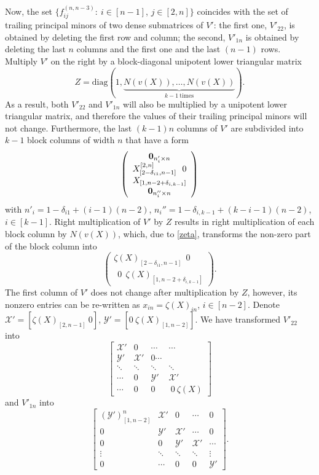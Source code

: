 \documentclass{amsart}
\theoremstyle{definition}
\theoremstyle{remark}
\numberwithin{equation}{section}
\numberwithin{theorem}{section}
\begin{document}
Now, the set $\{ f_{ij}^{(n, n-3)}{{:\ }} i\in [n-1]$, $j\in [2, n]\}$
coincides with the set of trailing principal minors of two dense submatrices of
$V'$: the first one, $V'_{22}$, is obtained by deleting the first row
and column; the second, $V'_{1n}$ is obtained by deleting the last $n$ columns and
the first one and the last $(n-1)$ rows.
Multiply $V'$ on the right by a block-diagonal unipotent lower triangular
matrix 
$$
Z=\mbox{diag}(1,\underbrace{N(v(X)),\ldots, N(v(X))}_{k-1 \ \mbox{times}}).
$$ 
As a result, both $V'_{22}$ and  $V'_{1n}$ will also be multiplied by a
unipotent lower triangular matrix, and therefore the values  of their trailing principal
minors will not change. Furthermore, the last $(k-1)n$ columns of   $V'$ are
subdivided into $k-1$ block columns of width $n$  that have a  form
$$
\left (
\begin{array}{c}
{\bf 0}_{n'_i\times n} \\
X_{[2-\delta_{i1},n-1]}^{[2,n]} \ \ 0\\
 X_{[1,n-2+\delta_{i,k-1}]} \\
{\bf 0}_{n_i''\times n} 
\end{array}
\right ) 
$$
with $n'_i=1-\delta_{i1}+(i-1)(n-2)$, $n_i''=1-\delta_{i,k-1}+(k-i-1)(n-2)$, $i\in [k-1]$.
Right multiplication of $V'$ by $Z$ results in right multiplication of each
block column
by $N(v(X))$, which, due to \eqref{zeta}, transforms the non-zero part of the block
column into
$$
\left (
\begin{array}{c}
\zeta(X)_{[2-\delta_{i1},n-1]} \ \  0\\
\ \ 0\ \ \zeta(X)_{[1,n-2+\delta_{i,k-1}]}
\end{array}
\right ).
$$
The first column of $V'$ does not change after multiplication by $Z$, however,
its nonzero entries can be re-written as $x_{in}=\zeta(X)_{in}$,  $i\in[n-2]$.
Denote  ${{\mathcal X}}'=\left [\zeta(X)_{[2,n-1]}\ 0\right ]$, ${{\mathcal Y}}'=\left [ 0\
\zeta(X)_{[1,n-2]}\right ]$.
We have transformed $V'_{22}$ into
\[
 \left [
\begin{array}{cccc}
 {{\mathcal X}}' & 0 & \cdots & \cdots\\
{{\mathcal Y}}' & {{\mathcal X}}' & 0 \cdots  \\
 \ddots& \ddots &\ddots & \ddots \\
 \cdots & 0 & {{\mathcal Y}}' & {{\mathcal X}}' \\
\cdots & 0 &0 &\  0\  \zeta(X)
\end{array}
\right ]
\]
and  $V'_{1n}$ into
\[
 \left [
\begin{array}{ccccc}
({{\mathcal Y}}')^n_{[1,n-2]} & {{\mathcal X}}' & 0 & \cdots & 0 \\
0 & {{\mathcal Y}}' & {{\mathcal X}}' &\cdots & 0  \\
0 & 0 &{{\mathcal Y}}' &{{\mathcal X}}' &\cdots \\
\vdots& \ddots& \ddots &\ddots &\vdots \\
0 & \cdots & 0 & 0 &   {{\mathcal Y}}'
\end{array}
\right ].
\]
\end{document}
